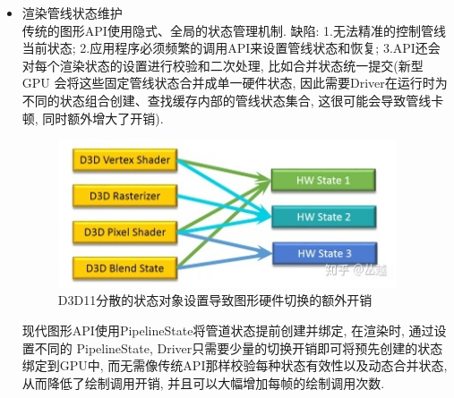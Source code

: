 \documentclass[UTF8]{ctexart}
\begin{document}
\begin{itemize}
\item 渲染管线状态维护
  \\传统的图形API使用隐式、全局的状态管理机制. 缺陷: 1.无法精准的控制管线当前状态; 2.应用程序必须频繁的调用API来设置管线状态和恢复; 3.API还会对每个渲染状态的设置进行校验和二次处理, 比如合并状态统一提交(新型 GPU 会将这些固定管线状态合并成单一硬件状态, 因此需要Driver在运行时为不同的状态组合创建、查找缓存内部的管线状态集合, 这很可能会导致管线卡顿, 同时额外增大了开销).
  \begin{figure}[H]
    \includegraphics[width=10cm]{render_state_merge.jpg}

    \centering
    \caption{D3D11分散的状态对象设置导致图形硬件切换的额外开销}
    \label{fig:gpu_rendering_pipline_state_merge}
  \end{figure}

  现代图形API使用PipelineState将管道状态提前创建并绑定, 在渲染时, 通过设置不同的 PipelineState, Driver只需要少量的切换开销即可将预先创建的状态绑定到GPU中, 而无需像传统API那样校验每种状态有效性以及动态合并状态, 从而降低了绘制调用开销, 并且可以大幅增加每帧的绘制调用次数.


\end{itemize}
\end{document}
